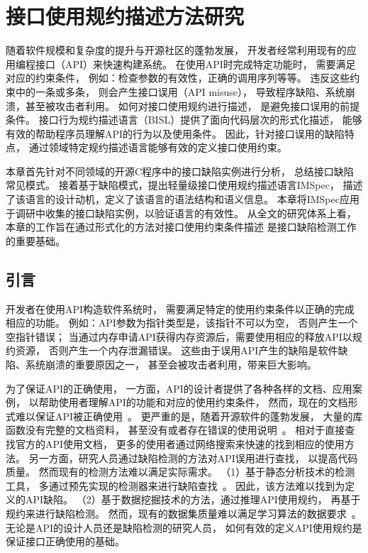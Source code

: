 \chapter{接口使用规约描述方法研究}
\label{cha:impsec}
随着软件规模和复杂度的提升与开源社区的蓬勃发展，
开发者经常利用现有的应用编程接口（API）来快速构建系统。
在使用API时完成特定功能时，
需要满足对应的约束条件，
例如：检查参数的有效性，正确的调用序列等等。
违反这些约束中的一条或多条，
则会产生接口误用（API misuse），
导致程序缺陷、系统崩溃，甚至被攻击者利用。
如何对接口使用规约进行描述，
是避免接口误用的前提条件。
接口行为规约描述语言（BISL）提供了面向代码层次的形式化描述，
能够有效的帮助程序员理解API的行为以及使用条件。
因此，针对接口误用的缺陷特点，
通过领域特定规约描述语言能够有效的定义接口使用约束。


本章首先针对不同领域的开源C程序中的接口缺陷实例进行分析，
总结接口缺陷常见模式。
接着基于缺陷模式，提出轻量级接口使用规约描述语言IMSpec，
描述了该语言的设计动机，定义了该语言的语法结构和语义信息。
本章将IMSpec应用于调研中收集的接口缺陷实例，以验证语言的有效性。
从全文的研究体系上看，本章的工作旨在通过形式化的方法对接口使用约束条件描述
是接口缺陷检测工作的重要基础。


\section{引言}
开发者在使用API构造软件系统时，
需要满足特定的使用约束条件以正确的完成相应的功能。
例如：API参数为指针类型是，该指针不可以为空，
否则产生一个空指针错误；
当通过内存申请API获得内存资源后，需要使用相应的释放API以规约资源，
否则产生一个内存泄漏错误。
这些由于误用API产生的缺陷是软件缺陷、系统崩溃的重要原因之一，
甚至会被攻击者利用，带来巨大影响。


为了保证API的正确使用，
一方面，API的设计者提供了各种各样的文档、应用案例，
以帮助使用者理解API的功能和对应的使用约束条件，
然而，现在的文档形式难以保证API被正确使用~\cite{09-icse-doc}。
更严重的是，随着开源软件的蓬勃发展，
大量的库函数没有完整的文档资料，
甚至没有或者存在错误的使用说明~\cite{15-ieee-doc-fail, 17-icse-api-doc}。
相对于直接查找官方的API使用文档，
更多的使用者通过网络搜索来快速的找到相应的使用方法。
另一方面，研究人员通过缺陷检测的方法对API误用进行查找，
以提高代码质量。
然而现有的检测方法难以满足实际需求。
（1）基于静态分析技术的检测工具，
多通过预先实现的检测器来进行缺陷查找~\cite{15-coufless-static-survey}。
因此，该方法难以找到为定义的API缺陷。
（2）基于数据挖掘技术的方法，通过推理API使用规约，
再基于规约来进行缺陷检测。
然而，现有的数据集质量难以满足学习算法的数据要求~\cite{survey18}。
无论是API的设计人员还是缺陷检测的研究人员，
如何有效的定义API使用规约是保证接口正确使用的基础。

